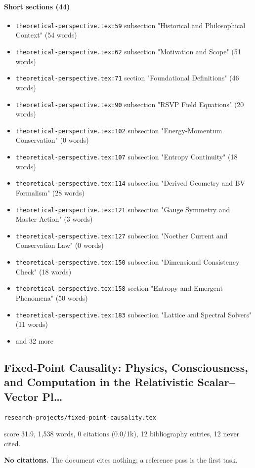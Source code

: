 \documentclass[11pt]{article}
\newcommand{\loc}[1]{{\small\color{muted}\texttt{#1}}}
\begin{document}
\paragraph{Short sections (44)}
\begin{itemize}
\item \loc{theoretical-perspective.tex:59} subsection "Historical and Philosophical Context" (54 words)
\item \loc{theoretical-perspective.tex:62} subsection "Motivation and Scope" (51 words)
\item \loc{theoretical-perspective.tex:71} section "Foundational Definitions" (46 words)
\item \loc{theoretical-perspective.tex:90} subsection "RSVP Field Equations" (20 words)
\item \loc{theoretical-perspective.tex:102} subsection "Energy-Momentum Conservation" (0 words)
\item \loc{theoretical-perspective.tex:107} subsection "Entropy Continuity" (18 words)
\item \loc{theoretical-perspective.tex:114} subsection "Derived Geometry and BV Formalism" (28 words)
\item \loc{theoretical-perspective.tex:121} subsection "Gauge Symmetry and Master Action" (3 words)
\item \loc{theoretical-perspective.tex:127} subsection "Noether Current and Conservation Law" (0 words)
\item \loc{theoretical-perspective.tex:150} subsection "Dimensional Consistency Check" (18 words)
\item \loc{theoretical-perspective.tex:158} section "Entropy and Emergent Phenomena" (50 words)
\item \loc{theoretical-perspective.tex:183} subsection "Lattice and Spectral Solvers" (11 words)
\item[] {\color{muted}\small and 32 more}
\end{itemize}
\subsection{Fixed-Point Causality: Physics, Consciousness, and Computation in the Relativistic Scalar--Vector Pl\ldots{}}
\loc{research-projects/\allowbreak{}fixed-point-causality.tex}\par
score 31.9, 1,538 words, 0 citations (0.0/1k), 12 bibliography entries, 12 never cited.

\textbf{No citations.} The document cites nothing; a reference pass is the first task.
\end{document}

